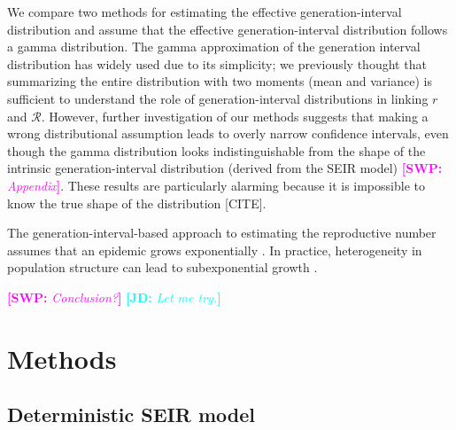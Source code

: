 \documentclass[12pt]{article}
\newcommand{\RR}{\ensuremath{{\mathcal R}}}
\newcommand{\comment}[3]{\textcolor{#1}{\textbf{[#2: }\textsl{#3}\textbf{]}}}
\newcommand{\jd}[1]{\comment{cyan}{JD}{#1}}
\newcommand{\swp}[1]{\comment{magenta}{SWP}{#1}}
\begin{document}
We compare two methods for estimating the effective generation-interval distribution and assume that the effective generation-interval distribution follows a gamma distribution.
The gamma approximation of the generation interval distribution has widely used due to its simplicity;
we previously thought that summarizing the entire distribution with two moments (mean and variance) is sufficient to understand the role of generation-interval distributions in linking $r$ and $\RR$.
However, further investigation of our methods suggests that making a wrong distributional assumption leads to overly narrow confidence intervals, even though the gamma distribution looks indistinguishable from the shape of the intrinsic generation-interval distribution (derived from the SEIR model) \swp{Appendix}.
These results are particularly alarming because it is impossible to know the true shape of the distribution [CITE].

The generation-interval-based approach to estimating the reproductive number assumes that an epidemic grows exponentially \citep{wallinga2007generation, park2019practical}.
In practice, heterogeneity in population structure can lead to subexponential growth \citep{chowell2016characterizing, viboud2016generalized}.


\swp{Conclusion?}
\jd{Let me try.}

\section{Methods}

\subsection{Deterministic SEIR model}
\end{document}
